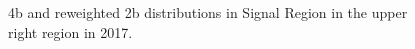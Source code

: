 \begin{figure}[ht]
 
 
    \caption{4b and reweighted 2b distributions in Signal Region in the upper right region in 2017.}
    \label{fig:upper-right-4b-SR-2017}
\end{figure}


